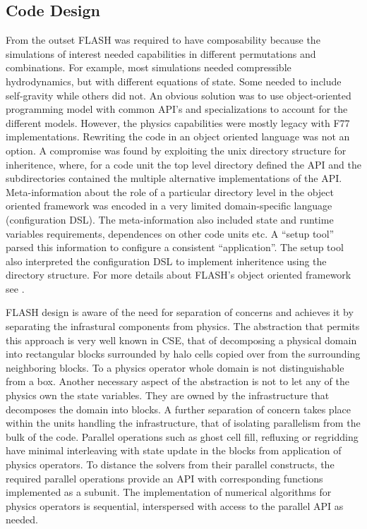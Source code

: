\subsection{Code Design}
\label{sec:FLASHdesign}
From the outset FLASH was required to have composability because the
simulations of interest needed capabilities in different permutations
and combinations. For example, most simulations needed compressible
hydrodynamics, but with different equations of state. Some needed to
include self-gravity while others did not. An 
obvious solution was to use object-oriented programming model with
common API's and specializations to account for the different
models. However, the physics capabilities were mostly legacy with F77
implementations. Rewriting the code in an object oriented language was
not an option. A compromise was found by exploiting the unix directory
structure for inheritence, where, for a code unit the top level
directory defined the API and the subdirectories contained the
multiple alternative implementations of the API.  Meta-information
about the role of a particular directory level in the object oriented framework
was encoded in a very limited domain-specific language (configuration
DSL). The meta-information also included state and runtime variables
requirements, dependences on other code units etc. A ``setup tool''
parsed this information to configure a consistent ``application''. The
setup tool also interpreted the configuration DSL to implement 
inheritence using the directory structure. For more details about
FLASH's object oriented framework see \cite{Dubey2009, Fryxell2000}.   

FLASH design is aware of the need for separation of concerns and
achieves it by separating the infrastural components
from physics. The abstraction that permits this approach is very
well known in CSE, that of decomposing a physical domain into
rectangular blocks surrounded by halo cells copied over from the
surrounding neighboring blocks. To a physics operator whole domain is
not distinguishable from a box. Another necessary aspect of the abstraction 
is not to let any of the  physics own the state
variables. They are owned by the infrastructure that 
decomposes the domain into blocks. A further separation of concern
takes place within the units handling the infrastructure, that of
isolating parallelism from the bulk of the code. Parallel
operations such as ghost cell fill, refluxing or regridding have
minimal interleaving with state update in the blocks from application
of physics operators. To distance the solvers from their parallel
constructs, the required parallel operations provide an API with
corresponding functions implemented as a subunit. The implementation
of numerical algorithms for physics operators is sequential,
interspersed with access to the parallel API as needed. 

